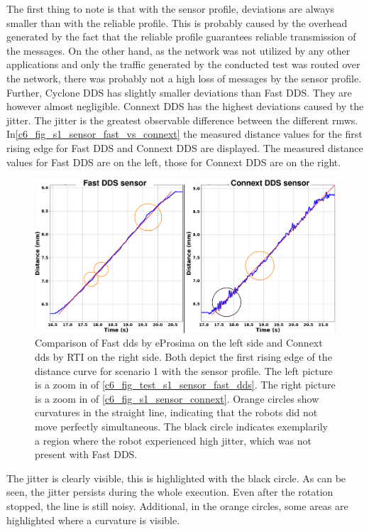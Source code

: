 The first thing to note is that with the sensor profile, deviations are always smaller than with the reliable profile. This is probably caused by the overhead generated by the fact that the reliable profile guarantees reliable transmission of the messages. On the other hand, as the network was not utilized by any other applications and only the traffic generated by the conducted test was routed over the network, there was probably not a high loss of messages by the sensor profile.\newline
Further, Cyclone DDS has slightly smaller deviations than Fast DDS. They are however almost negligible. Connext DDS has the highest deviations caused by the jitter. The jitter is the greatest observable difference between the different \glspl{rmw}. In\autoref{c6_fig_s1_sensor_fast_vs_connext} the measured distance values for the first rising edge for Fast DDS and Connext DDS are displayed. The measured distance values for Fast DDS are on the left, those for Connext DDS are on the right.
\begin{figure}[htbp]
	\centering
	\includegraphics[width=1\textwidth]{Figures/c6/s1/s1_sensor_fast_vs_connext.png}
	\caption{Comparison of Fast \gls{dds} by eProsima on the left side and Connext \gls{dds} by RTI on the right side. Both depict the first rising edge of the distance curve for scenario 1 with the sensor profile. The left picture is a zoom in of \autoref{c6_fig_test_s1_sensor_fast_dds}. The right picture is a zoom in of \autoref{c6_fig_s1_sensor_connext}. Orange circles show curvatures in the straight line, indicating that the robots did not move perfectly simultaneous. The black circle indicates exemplarily a region where the robot experienced high jitter, which was not present with Fast DDS.}
	\label{c6_fig_s1_sensor_fast_vs_connext}
\end{figure}
The jitter is clearly visible, this is highlighted with the black circle. As can be seen, the jitter persists during the whole execution. Even after the rotation stopped, the line is still noisy. Additional, in the orange circles, some areas are highlighted where a curvature is visible.

